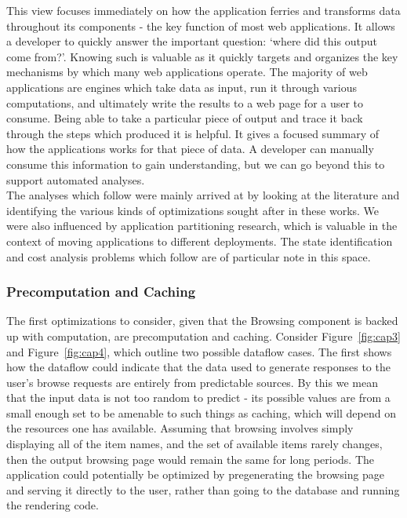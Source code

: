 \documentclass[msc,oneside]{ubcthesis}
\begin{document}
This view focuses immediately on how the application ferries and transforms data throughout its components - the key function of most web applications. It allows a developer to quickly answer the important question: `where did this output come from?'. Knowing such is valuable as it quickly targets and organizes the key mechanisms by which many web applications operate. The majority of web applications are engines which take data as input, run it through various computations, and ultimately write the results to a web page for a user to consume. Being able to take a particular piece of output and trace it back through the steps which produced it is helpful. It gives a focused summary of how the applications works for that piece of data. A developer can manually consume this information to gain understanding, but we can go beyond this to support automated analyses. \\

The analyses which follow were mainly arrived at by looking at the literature and identifying the various kinds of optimizations sought after in these works. We were also influenced by application partitioning research, which is valuable in the context of moving applications to different deployments. The state identification and cost analysis problems which follow are of particular note in this space.

\subsubsection{Precomputation and Caching}
The first optimizations to consider, given that the Browsing component is backed up with computation, are precomputation and caching. Consider Figure~\ref{fig:cap3} and Figure~\ref{fig:cap4}, which outline two possible dataflow cases. The first shows how the dataflow could indicate that the data used to generate responses to the user's browse requests are entirely from predictable sources. By this we mean that the input data is not too random to predict - its possible values are from a small enough set to be amenable to such things as caching, which will depend on the resources one has available. Assuming that browsing involves simply displaying all of the item names, and the set of available items rarely changes, then the output browsing page would remain the same for long periods. The application could potentially be optimized by pregenerating the browsing page and serving it directly to the user, rather than going to the database and running the rendering code.\\
\end{document}
